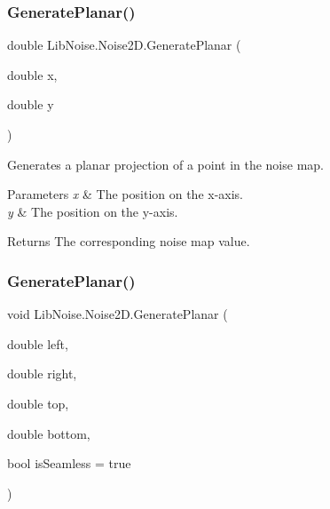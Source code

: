 \subsubsection{\texorpdfstring{Generate\+Planar()}{GeneratePlanar()}\hspace{0.1cm}{\footnotesize\ttfamily [1/2]}}
{\footnotesize\ttfamily double Lib\+Noise.\+Noise2\+D.\+Generate\+Planar (\begin{DoxyParamCaption}\item[{double}]{x,  }\item[{double}]{y }\end{DoxyParamCaption})\hspace{0.3cm}{\ttfamily [private]}}



Generates a planar projection of a point in the noise map. 


\begin{DoxyParams}{Parameters}
{\em x} & The position on the x-\/axis.\\
\hline
{\em y} & The position on the y-\/axis.\\
\hline
\end{DoxyParams}
\begin{DoxyReturn}{Returns}
The corresponding noise map value.
\end{DoxyReturn}
\mbox{\label{class_lib_noise_1_1_noise2_d_ac771707226342fb931f5d25365728503}} 
\subsubsection{\texorpdfstring{Generate\+Planar()}{GeneratePlanar()}\hspace{0.1cm}{\footnotesize\ttfamily [2/2]}}
{\footnotesize\ttfamily void Lib\+Noise.\+Noise2\+D.\+Generate\+Planar (\begin{DoxyParamCaption}\item[{double}]{left,  }\item[{double}]{right,  }\item[{double}]{top,  }\item[{double}]{bottom,  }\item[{bool}]{is\+Seamless = {\ttfamily true} }\end{DoxyParamCaption})}



